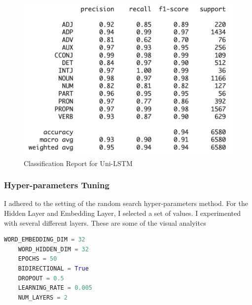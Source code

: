 \begin{figure}[h!]
	\centering
	\includegraphics[scale=0.7]{img/unidirectionallstm.png}
	\caption{Classification Report for Uni-LSTM}
\end{figure}


\subsubsection{Hyper-parameters Tuning}

I adhered to the setting of the random search hyper-parameters method. For the Hidden Layer and Embedding Layer, I selected a set of values. I experimented with several different layers. These are some of the visual analyitcs

\begin{lstlisting}[language=Python]
	WORD_EMBEDDING_DIM = 32
	WORD_HIDDEN_DIM = 32
	EPOCHS = 50
	BIDIRECTIONAL = True
	DROPOUT = 0.5
	LEARNING_RATE = 0.005
	NUM_LAYERS = 2
\end{lstlisting}

